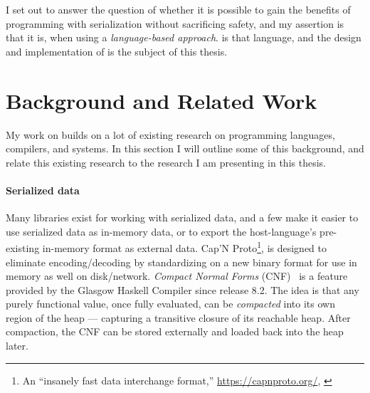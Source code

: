 I set out to answer the question of whether it is possible to gain the benefits
of programming with serialization without sacrificing safety, and my assertion
is that it is, when using a \emph{language-based approach}. \ourcalc{} is that
language, and the design and implementation of \ourcalc{} is the subject of this
thesis.

\section{Background and Related Work}\label{sec:bg}

My work on \ourcalc{} builds on a lot of existing research on programming languages,
compilers, and systems. In this section I will outline some of this background, and
relate this existing research to the research I am presenting in this thesis.

\paragraph{Serialized data}

Many libraries exist for working with serialized data, and a few
make it easier to use serialized data as in-memory data, or to export the
host-language's pre-existing in-memory format as external data.
Cap'N Proto\footnote{An ``insanely fast data interchange format,''
  \url{https://capnproto.org/}, \cite{capnproto}},
is designed to eliminate encoding/decoding by
standardizing on a new binary format for use in memory as well on disk/network.
%
%
{\em Compact Normal Forms} (CNF)~\cite{cnf-icfp15} is
a feature provided by the Glasgow Haskell Compiler since release 8.2.
%
%
The idea is that any purely functional value, once fully evaluated, can be {\em compacted}
into its own region of the heap
--- capturing a transitive closure of its reachable heap.
After compaction, the CNF can be stored externally and loaded
back into the heap later.

